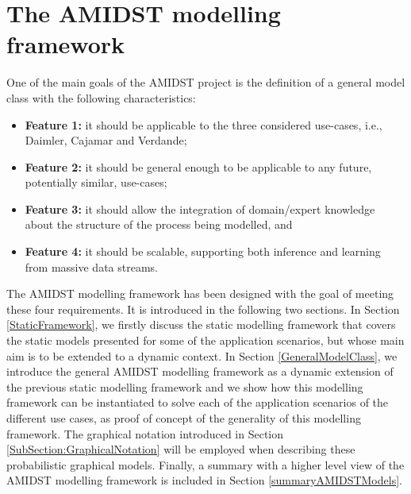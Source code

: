 \section{The AMIDST modelling framework}\label{section:AMIDSTmodelClass}

One of the main goals of the AMIDST project is the definition of a general model class with the following characteristics: 

\begin{itemize}
\item \textbf{Feature 1:} it should be applicable to the three considered use-cases, i.e., Daimler, Cajamar and Verdande;

\item \textbf{Feature 2:}  it should be general enough to be applicable to any future, potentially similar, use-cases;

\item \textbf{Feature 3:} it should allow the integration of domain/expert knowledge about the structure of the process being modelled, and

\item \textbf{Feature 4:} it should be scalable, supporting both inference and learning from massive data streams.

\end{itemize}



The AMIDST modelling framework has been designed with the goal of meeting these four requirements. It is introduced in the following two sections. In Section \ref{StaticFramework}, we firstly discuss the static modelling framework that covers the static models presented for some of the application scenarios, but whose main aim is to be extended to a dynamic context. In Section \ref{GeneralModelClass}, we introduce the general AMIDST modelling framework as a dynamic extension of the previous static modelling framework and we show how this modelling framework can be instantiated to solve each of the application scenarios of the different use cases, as proof of concept of the generality of this modelling framework. The graphical notation introduced in Section \ref{SubSection:GraphicalNotation} will be employed when describing these probabilistic graphical models. Finally, a summary with a higher level view of the AMIDST modelling framework is included in Section \ref{summaryAMIDSTModels}.

